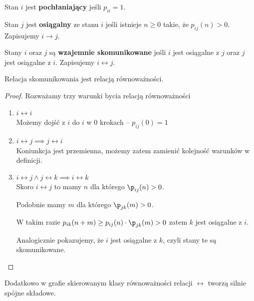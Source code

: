 \begin{definition}
	Stan \(i\) jest \textbf{pochłaniający} jeśli \(p_{ii} = 1\).
\end{definition}

\begin{definition}
	Stan \(j\) jest \textbf{osiągalny} ze stanu \(i\) jeśli istnieje \(n \geq 0\) takie, że
	\(p_{ij}(n) > 0\). Zapisujemy \(i \rightarrow j\).
\end{definition}

\begin{definition}
	Stany \(i\) oraz \(j\) są \textbf{wzajemnie skomunikowane} jeśli \(i\) jest osiągalne z \(j\) oraz
	\(j\) jest osiągalne z \(i\). Zapisujemy \( i \leftrightarrow j \).
\end{definition}

\begin{lemma}
	Relacja skomunikowania jest relacją równoważności.
\end{lemma}
\begin{proof} Rozważamy trzy warunki bycia relacją równoważności
	\begin{enumerate}
		\item \( i \leftrightarrow i \) \\
		      Możemy dojść z \( i \) do \( i \) w 0 krokach -- \(p_{ij}(0) = 1\)

		\item \( i \leftrightarrow j \implies j \leftrightarrow i \) \\
		      Koniunkcja jest przemienna, możemy zatem zamienić kolejność warunków w definicji.

		\item \( i \leftrightarrow j \land j \leftrightarrow k \implies i \leftrightarrow k \) \\
		      Skoro \( i \leftrightarrow j \) to mamy \( n \) dla którego \(\p_{ij}(n) > 0\).

		      Podobnie mamy \( m \) dla którego \( \p_{jk}(m) > 0 \).

		      W takim razie \( p_{ik}(n+m) \geq p_{ij}(n) \cdot \p_{jk}(m) > 0 \)
		      zatem \( k \) jest osiągalne z \( i \).

		      Analogicznie pokazujemy, że \( i \) jest osiągalne z \( k \), czyli stany te są skomunikowane.

	\end{enumerate}
\end{proof}

Dodatkowo w grafie skierowanym klasy równoważności relacji \( \leftrightarrow \) tworzą silnie spójne składowe.


